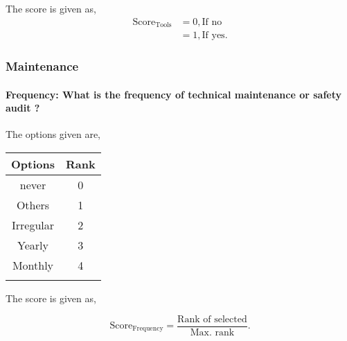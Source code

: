 \documentclass[oneside,twocolumn]{article}
\newcommand{\tsub}[2]{\text{#1}_{\text{#2}}}
\newcommand{\dsub}[2]{\dfrac{\text{#1}}{\text{#2}}}
\newcommand{\singsel}[1]
{
	\[
		\tsub{Score}{#1} = \dsub{Rank of selected}{Max. rank}.
	\]
}
\newenvironment{ttable}
{
\begin{center}
\begin{tabular}{c|c}
\hline
}
{
\\ \hline
\end{tabular}
\end{center}
}
\begin{document}
The score is given as,
\begin{align*}
\tsub{Score}{Tools} &= 0, \text{If no} \\
        &= 1, \text{If yes}.
\end{align*}
\subsubsection{Maintenance}

\paragraph{Frequency: What is the frequency of technical maintenance or safety audit ?}

The options given are,
\begin{ttable}
Options & Rank \\ \hline
never & 0 \\
Others & 1 \\
Irregular & 2 \\
Yearly & 3 \\
Monthly & 4 \\
\hline
\end{ttable}
The score is given as,
\singsel{Frequency}
\end{document}

